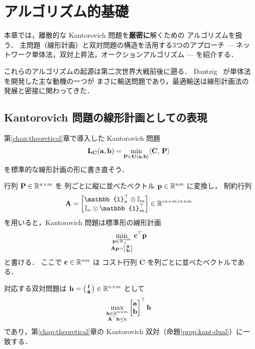 
\chapter{アルゴリズム的基礎}\label{chap:algorithmic}

本章では，離散的な Kantorovich 問題を\textbf{厳密に}解くための
アルゴリズムを扱う．
主問題（線形計画）と双対問題の構造を活用する3つのアプローチ
--- ネットワーク単体法，双対上昇法，オークションアルゴリズム ---
を紹介する．

これらのアルゴリズムの起源は第二次世界大戦前後に遡る．
Dantzig~\cite{Dantzig1951} が単体法を開発した主な動機の一つが
まさに輸送問題であり，最適輸送は線形計画法の発展と密接に関わってきた．


\section{Kantorovich 問題の線形計画としての表現}\label{sec:kant-lp}

第\ref{chap:theoretical}章で導入した Kantorovich 問題
\[
  \mathbf{L_C}(\mathbf{a}, \mathbf{b})
  = \min_{\mathbf{P} \in \mathbf{U}(\mathbf{a}, \mathbf{b})}
  \langle \mathbf{C},\, \mathbf{P} \rangle
\]
を標準的な線形計画の形に書き直そう．

行列 $\mathbf{P} \in \mathbb{R}^{n \times m}$ を
列ごとに縦に並べたベクトル $\mathbf{p} \in \mathbb{R}^{nm}$ に変換し，
制約行列
\[
  \mathbf{A} =
  \begin{bmatrix}
    \mathbb{1}_n^\top \otimes \mathbb{I}_m \\
    \mathbb{I}_n \otimes \mathbb{1}_m^\top
  \end{bmatrix}
  \in \R^{(n+m) \times nm}
\]
を用いると，Kantorovich 問題は標準形の線形計画
\begin{equation}\label{eq:lp-standard}
  \min_{\substack{\mathbf{p} \in \mathbb{R}^{nm}_+ \\
  \mathbf{A}\mathbf{p} = \begin{bsmallmatrix} \mathbf{a} \\ \mathbf{b} \end{bsmallmatrix}}}
  \mathbf{c}^\top \mathbf{p}
\end{equation}
と書ける．
ここで $\mathbf{c} \in \mathbb{R}^{nm}$ は
コスト行列 $\mathbf{C}$ を列ごとに並べたベクトルである．

対応する双対問題は
$\mathbf{h} = \bigl(\begin{smallmatrix} \mathbf{f} \\ \mathbf{g} \end{smallmatrix}\bigr) \in \mathbb{R}^{n+m}$ として
\begin{equation}\label{eq:lp-dual}
  \max_{\substack{\mathbf{h} \in \mathbb{R}^{n+m} \\
  \mathbf{A}^\top \mathbf{h} \leq \mathbf{c}}}
  \begin{bmatrix} \mathbf{a} \\ \mathbf{b} \end{bmatrix}^\top \mathbf{h}
\end{equation}
であり，第\ref{chap:theoretical}章の
Kantorovich 双対（命題\ref{prop:kant-dual}）に一致する．


